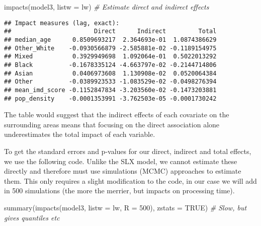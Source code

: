 \documentclass[
]{book}
\newenvironment{Shaded}{\begin{snugshade}}{\end{snugshade}}
\newcommand{\AttributeTok}[1]{\textcolor[rgb]{0.77,0.63,0.00}{#1}}
\newcommand{\CommentTok}[1]{\textcolor[rgb]{0.56,0.35,0.01}{\textit{#1}}}
\newcommand{\ConstantTok}[1]{\textcolor[rgb]{0.00,0.00,0.00}{#1}}
\newcommand{\DecValTok}[1]{\textcolor[rgb]{0.00,0.00,0.81}{#1}}
\newcommand{\FunctionTok}[1]{\textcolor[rgb]{0.00,0.00,0.00}{#1}}
\newcommand{\NormalTok}[1]{#1}
\begin{document}
\begin{Shaded}
\begin{Highlighting}[]
\FunctionTok{impacts}\NormalTok{(model3, }\AttributeTok{listw =}\NormalTok{ lw) }\CommentTok{\# Estimate direct and indirect effects}
\end{Highlighting}
\end{Shaded}

\begin{verbatim}
## Impact measures (lag, exact):
##                       Direct      Indirect         Total
## median_age      0.8509693217  2.364693e-01  1.0874386629
## Other_White    -0.0930566879 -2.585881e-02 -0.1189154975
## Mixed           0.3929949698  1.092064e-01  0.5022013292
## Black          -0.1678335124 -4.663797e-02 -0.2144714806
## Asian           0.0406973608  1.130908e-02  0.0520064384
## Other          -0.0389923533 -1.083529e-02 -0.0498276394
## mean_imd_score -0.1152847834 -3.203560e-02 -0.1473203881
## pop_density    -0.0001353991 -3.762503e-05 -0.0001730242
\end{verbatim}

The table would suggest that the indirect effects of each covariate on the surrounding areas means that focusing on the direct association alone underestimates the total impact of each variable.

To get the standard errors and p-values for our direct, indirect and total effects, we use the following code. Unlike the SLX model, we cannot estimate these directly and therefore must use simulations (MCMC) approaches to estimate them. This only requires a slight modification to the code, in our case we will add in 500 simulations (the more the merrier, but impacts on processing time).

\begin{Shaded}
\begin{Highlighting}[]
\FunctionTok{summary}\NormalTok{(}\FunctionTok{impacts}\NormalTok{(model3, }\AttributeTok{listw =}\NormalTok{ lw, }\AttributeTok{R =} \DecValTok{500}\NormalTok{), }\AttributeTok{zstats =} \ConstantTok{TRUE}\NormalTok{) }\CommentTok{\# Slow, but gives quantiles etc}
\end{Highlighting}
\end{Shaded}
\end{document}
